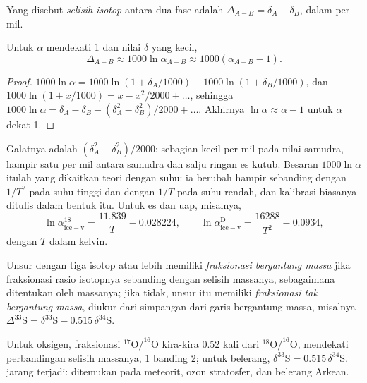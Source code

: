 \begin{definition}\label{def:b3:stable-isotopes:big-delta}
Yang disebut \emph{selisih isotop}
antara dua fase adalah $\Delta_{A-B} = \delta_A - \delta_B$, dalam per mil.
\end{definition}

\begin{proposition}
\label{prop:b3:stable-isotopes:big-delta}
Untuk $\alpha$ mendekati 1 dan nilai $\delta$ yang kecil,
\[
\Delta_{A-B} \approx 1000\ln\alpha_{A-B} \approx 1000(\alpha_{A-B} - 1).
\]
\end{proposition}

\begin{proof}
$1000\ln\alpha = 1000\ln(1 + \delta_A/1000) - 1000\ln(1 + \delta_B/1000)$, dan
$1000\ln(1 + x/1000) = x - x^2/2000 + \dots$, sehingga $1000\ln\alpha = \delta_A -
\delta_B - (\delta_A^2 - \delta_B^2)/2000 + \dots$. Akhirnya $\ln\alpha \approx
\alpha - 1$ untuk $\alpha$ dekat 1.
\end{proof}

Galatnya adalah $(\delta_A^2 - \delta_B^2)/2000$: sebagian kecil per mil pada
nilai samudra, hampir satu per mil antara samudra dan salju ringan
es kutub.
Besaran $1000\ln\alpha$ itulah yang dikaitkan teori dengan suhu: ia
berubah hampir sebanding dengan $1/T^2$ pada suhu tinggi dan dengan $1/T$ pada suhu rendah,
dan kalibrasi biasanya ditulis dalam bentuk itu. Untuk es dan uap, misalnya,
\[
\ln\alpha^{18}_{\mathrm{ice-v}} = \frac{11.839}{T} - 0.028224, \qquad
\ln\alpha^{\mathrm D}_{\mathrm{ice-v}} = \frac{16288}{T^2} - 0.0934,
\]
dengan $T$ dalam kelvin.

\begin{definition}\label{def:b3:stable-isotopes:mif}
Unsur dengan tiga isotop atau lebih memiliki \emph{fraksionasi
bergantung massa} jika fraksionasi
rasio isotopnya sebanding dengan selisih massanya, sebagaimana ditentukan oleh
massanya; jika tidak, unsur itu memiliki \emph{fraksionasi
tak bergantung massa}, diukur dari simpangan
dari garis bergantung massa, misalnya $\Delta^{33}\mathrm S = \delta^{33}\mathrm S
- 0.515\,\delta^{34}\mathrm S$.
\end{definition}

Untuk oksigen, fraksionasi $^{17}\mathrm O/^{16}\mathrm O$ kira-kira 0.52 kali
dari $^{18}\mathrm O/^{16}\mathrm O$, mendekati perbandingan selisih massanya, 1 banding 2;
untuk belerang, $\delta^{33}\mathrm S = 0.515\,\delta^{34}\mathrm S$.  jarang terjadi: ditemukan pada meteorit, ozon stratosfer, dan
belerang Arkean.

